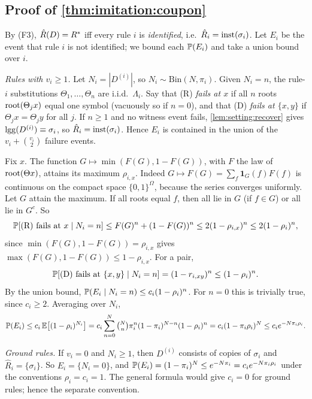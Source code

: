 \subsection{Proof of \texorpdfstring{\cref{thm:imitation:coupon}}{the coupon-collector theorem}}\label{app:imitation:coupon}

By (F3), $\hat R(D)=R^{*}$ iff every rule $i$ is \emph{identified}, i.e.\ $\hat R_i=\mathrm{inst}(\sigma_i)$. Let $E_i$ be the event that rule $i$ is not identified; we bound each $\mathbb{P}(E_i)$ and take a union bound over $i$.

\emph{Rules with $v_i\ge1$.} Let $N_i=|D^{(i)}|$, so $N_i\sim\mathrm{Bin}(N,\pi_i)$. Given $N_i=n$, the rule-$i$ substitutions $\Theta_1,\dots,\Theta_n$ are i.i.d.\ $\Lambda_i$. Say that (R) \emph{fails at $x$} if all $n$ roots $\mathrm{root}(\Theta_jx)$ equal one symbol (vacuously so if $n=0$), and that (D) \emph{fails at $\{x,y\}$} if $\Theta_jx=\Theta_jy$ for all $j$. If $n\ge1$ and no witness event fails, \cref{lem:setting:recover} gives $\mathrm{lgg}(D^{(i)})\equiv\sigma_i$, so $\hat R_i=\mathrm{inst}(\sigma_i)$. Hence $E_i$ is contained in the union of the $v_i+\binom{v_i}2$ failure events.

Fix $x$. The function $G\mapsto\min(F(G),1-F(G))$, with $F$ the law of $\mathrm{root}(\Theta x)$, attains its maximum $\rho_{i,x}$. Indeed $G\mapsto F(G)=\sum_f\mathbf 1_G(f)F(f)$ is continuous on the compact space $\{0,1\}^\Omega$, because the series converges uniformly. Let $G$ attain the maximum. If all roots equal $f$, then all lie in $G$ (if $f\in G$) or all lie in $G^c$. So
\[
\mathbb{P}[\text{(R) fails at }x\mid N_i=n]\le F(G)^n+(1-F(G))^n\le2(1-\rho_{i,x})^n\le2(1-\rho_i)^n,
\]
since $\min(F(G),1-F(G))=\rho_{i,x}$ gives $\max(F(G),1-F(G))\le1-\rho_{i,x}$. For a pair,
\[
\mathbb{P}[\text{(D) fails at }\{x,y\}\mid N_i=n]=(1-r_{i,xy})^n\le(1-\rho_i)^n.
\]
By the union bound, $\mathbb{P}(E_i\mid N_i=n)\le c_i(1-\rho_i)^n$. For $n=0$ this is trivially true, since $c_i\ge2$. Averaging over $N_i$,
\[
\mathbb{P}(E_i)\le c_i\,\mathbb{E}\bigl[(1-\rho_i)^{N_i}\bigr]=c_i\sum_{n=0}^N\tbinom Nn\pi_i^n(1-\pi_i)^{N-n}(1-\rho_i)^n=c_i(1-\pi_i\rho_i)^N\le c_ie^{-N\pi_i\rho_i}.
\]

\emph{Ground rules.} If $v_i=0$ and $N_i\ge1$, then $D^{(i)}$ consists of copies of $\sigma_i$ and $\hat R_i=\{\sigma_i\}$. So $E_i=\{N_i=0\}$, and $\mathbb{P}(E_i)=(1-\pi_i)^N\le e^{-N\pi_i}=c_ie^{-N\pi_i\rho_i}$ under the conventions $\rho_i=c_i=1$. The general formula would give $c_i=0$ for ground rules; hence the separate convention.

